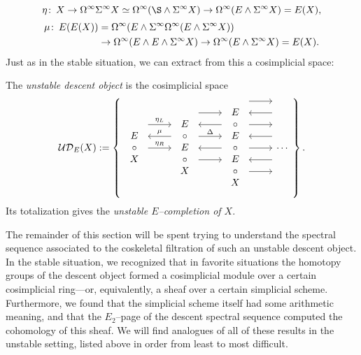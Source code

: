 \[\eta\co X \to \Loops^\infty \Susp^\infty X \simeq \Loops^\infty (\S \sm \Susp^\infty X) \to \Loops^\infty (E \sm \Susp^\infty X) = E(X),\]
\begin{align*}
\mu\colon\thinspace E(E(X)) & = \Omega^\infty(E \wedge \Sigma^\infty\Omega^\infty(E \wedge \Sigma^\infty X)) \\
& \to \Omega^\infty(E \wedge E \wedge \Sigma^\infty X) \to \Omega^\infty(E \wedge \Sigma^\infty X) = E(X).
\end{align*}
Just as in the stable situation, we can extract from this a cosimplicial space:
\begin{definition}
The \textit{unstable descent object} is the cosimplicial space
\[\sheaf{UD}_E(X) := \left\{
\begin{tikzcd}
\begin{array}{c} E \\ \circ \\ X \end{array} \arrow[leftarrow, shift left=\baselineskip]{r}{\mu} \arrow[shift left=(2*\baselineskip)]{r}{\eta_L} \arrow{r}{\eta_R} &
\begin{array}{c} E \\ \circ \\ E \\ \circ \\ X \end{array} \arrow[shift left=(3*\baselineskip)]{r} \arrow[leftarrow, shift left=(2*\baselineskip)]{r} \arrow[shift left=\baselineskip]{r}{\Delta} \arrow[leftarrow]{r} \arrow[shift right=\baselineskip]{r} &
\begin{array}{c} E \\ \circ \\ E \\ \circ \\ E \\ \circ \\ X \end{array} \arrow[shift left=(4*\baselineskip)]{r} \arrow[leftarrow, shift left=(3*\baselineskip)]{r} \arrow[shift left=(2*\baselineskip)]{r} \arrow[leftarrow, shift left=\baselineskip]{r} \arrow{r} \arrow[leftarrow, shift right=\baselineskip]{r} \arrow[shift right=(2*\baselineskip)]{r} &
\cdots
\end{tikzcd}
\right\}.\]
Its totalization gives the \textit{unstable $E$--completion of $X$}.
\end{definition}

The remainder of this section will be spent trying to understand the spectral sequence associated to the coskeletal filtration of such an unstable descent object.  In the stable situation, we recognized that in favorite situations the homotopy groups of the descent object formed a cosimplicial module over a certain cosimplicial ring---or, equivalently, a sheaf over a certain simplicial scheme.  Furthermore, we found that the simplicial scheme itself had some arithmetic meaning, and that the $E_2$--page of the descent spectral sequence computed the cohomology of this sheaf.  We will find analogues of all of these results in the unstable setting, listed above in order from least to most difficult.

